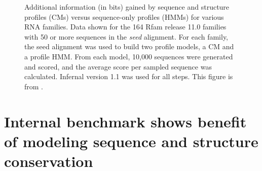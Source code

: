 \documentclass[custom,landscape,final,30pt,plainboxedsections]{sciposter-titleskipsmall}
\begin{document}
\begin{multicols}{3}
\begin{footnotesize}
\begin{figure}
\caption{Additional information (in bits) gained by sequence and
  structure profiles (CMs) versus sequence-only profiles (HMMs) for
  various RNA families.  
  Data shown for the 164 Rfam release 11.0 families
  with 50 or more sequences in the \emph{seed} alignment. For each
  family, the seed alignment was used to build two profile models, a
  CM and a profile HMM. From each model, 10,000 sequences were
  generated and scored, and the average score per sampled sequence was
  calculated. Infernal version 1.1 was used for all steps. This figure
  is from \cite{Nawrocki13b}.
}
\label{fig:avgscores}
\end{figure}
\end{footnotesize}

\columnbreak

\section*{Internal benchmark shows benefit of modeling sequence and
  structure conservation}


\end{multicols}
\end{document}
